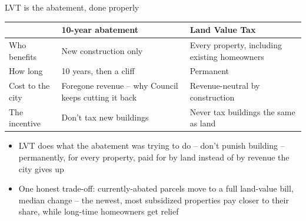 \documentclass[aspectratio=169,11pt]{beamer}
\begin{document}
\begin{frame}{LVT is the abatement, done properly}
\small
\begin{center}
\begin{tabularx}{0.96\linewidth}{@{} X X X @{}}
\toprule
 & \textbf{10-year abatement} & \textbf{Land Value Tax} \\ %
\midrule
Who benefits & New construction only & Every property, including existing homeowners \\
How long & 10 years, then a cliff & Permanent \\  %
Cost to the city & Foregone revenue -- why Council keeps cutting it back & Revenue-neutral by construction \\
The incentive & Don't tax new buildings & Never tax buildings the same as land \\
\bottomrule
\end{tabularx}
\end{center}
\vspace{0.5em}
\begin{itemize}
\item LVT does what the abatement was trying to do -- don't punish building -- permanently, for every property, paid for by land instead of by revenue the city gives up
\item One honest trade-off: currently-abated parcels move to a full land-value bill, median change \PhlAbatedReformMedian{} -- the newest, most subsidized properties pay closer to their share, while long-time homeowners get relief
\end{itemize}
\end{frame}
\end{document}

